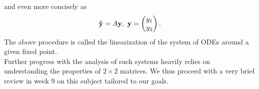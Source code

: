 \documentclass[11pt,a4paper,twoside]{article}
\begin{document}
	and even more concisely as
	\begin{equation}\label{4.11}
		\vb{\dot{y}} = A\vb{y},\ 
		\vb{y}
		=
		\begin{pmatrix}
			y_1\\
			y_2
		\end{pmatrix}.
	\end{equation}
	The above procedure is called the linearization of the system of ODEs around a given fixed point.\\
	Further progress with the analysis of such systems heavily relies on understanding the properties of $2 \times 2$ matrices. We thus proceed with a very brief review in week 9 on this subject tailored to our goals.
\end{document}
